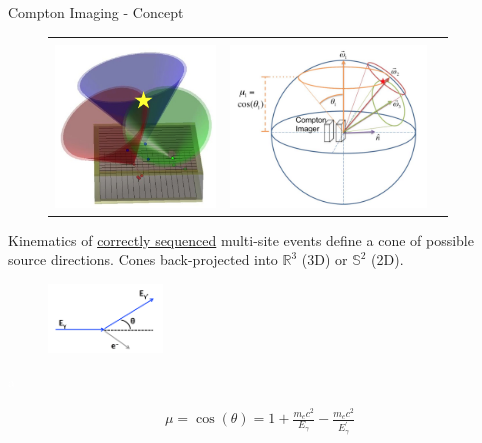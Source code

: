 \documentclass[xcolor=x11names,compress]{beamer}
\renewcommand{\(}{\begin{columns}}
\renewcommand{\)}{\end{columns}}
\newcommand{\<}[1]{\begin{column}{#1}}
\renewcommand{\>}{\end{column}}
\begin{document}
\begin{frame}{Compton Imaging - Concept}

\vspace{-10pt}

\begin{figure}
\begin{tabular}{ccc}
&& \cite{Haefner} \\[-3ex]
\includegraphics[height=1.7in]{Figures/Compton.png} & 
\includegraphics[height=1.7in]{Figures/Compton2.png} & 
\end{tabular}
\end{figure}

Kinematics of \underline{correctly sequenced} multi-site events define a cone of possible source directions. Cones back-projected into $\mathbb{R}^3$ (3D) or $\mathbb{S}^2$ (2D).

\vspace{-25pt}

\begin{figure}
\includegraphics[width=1.2in]{Figures/ComptonKinematic.png} 
\end{figure}

\hfill\textcolor{white}{a}

\begin{align*}
\mu = \cos(\theta) = 1 + \frac{m_e c^2}{E_\gamma} - \frac{m_e c^2}{E_\gamma^\prime}
\end{align*}

\end{frame}
\end{document}
